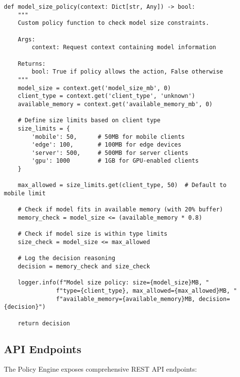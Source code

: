 \begin{lstlisting}[style=pythoncode, caption=Custom Policy Function Implementation]
def model_size_policy(context: Dict[str, Any]) -> bool:
    """
    Custom policy function to check model size constraints.
    
    Args:
        context: Request context containing model information
        
    Returns:
        bool: True if policy allows the action, False otherwise
    """
    model_size = context.get('model_size_mb', 0)
    client_type = context.get('client_type', 'unknown')
    available_memory = context.get('available_memory_mb', 0)
    
    # Define size limits based on client type
    size_limits = {
        'mobile': 50,      # 50MB for mobile clients
        'edge': 100,       # 100MB for edge devices
        'server': 500,     # 500MB for server clients
        'gpu': 1000        # 1GB for GPU-enabled clients
    }
    
    max_allowed = size_limits.get(client_type, 50)  # Default to mobile limit
    
    # Check if model fits in available memory (with 20% buffer)
    memory_check = model_size <= (available_memory * 0.8)
    
    # Check if model size is within type limits
    size_check = model_size <= max_allowed
    
    # Log the decision reasoning
    decision = memory_check and size_check
    
    logger.info(f"Model size policy: size={model_size}MB, "
               f"type={client_type}, max_allowed={max_allowed}MB, "
               f"available_memory={available_memory}MB, decision={decision}")
    
    return decision
\end{lstlisting}

\subsection{API Endpoints}

The Policy Engine exposes comprehensive REST API endpoints:

